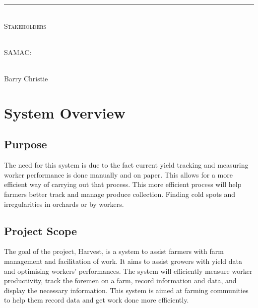 \documentclass[11pt]{article}
\begin{document}
\begin{titlepage}
\begin{center}
		\vspace{1cm}
		\rule{\linewidth}{0.5mm} \\[1cm]
		\textsc{\Large Stakeholders}\\[1cm]

		\begin{minipage}{0.4\textwidth}
			\begin{flushleft} \large
				\emph{} \\
				SAMAC:
			\end{flushleft}
		\end{minipage}
		\begin{minipage}{0.4\textwidth}
			\begin{flushright} \large
				\emph{} \\
				Barry Christie
			\end{flushright}
		\end{minipage}


	\end{center}
\end{titlepage}

\newpage
{}
\tableofcontents
\newpage
\listoffigures

\newpage
{}

\newpage
\section{System Overview}

\subsection{Purpose}
The need for this system is due to the fact current yield tracking and measuring worker performance is done manually and on paper. This allows for a more efficient way of carrying out that process. This more efficient process will help farmers better track and manage produce collection. Finding cold spots and irregularities in orchards or by workers.

\subsection{Project Scope}
The goal of the project, Harvest, is a  system to assist farmers with farm management and facilitation of work. It aims to assist growers with yield data and optimising workers' performances. The system will efficiently measure worker productivity, track the foremen on a farm, record information and data, and display the necessary information. This system is aimed at farming communities to help them record data and get work done more efficiently.
\end{document}
